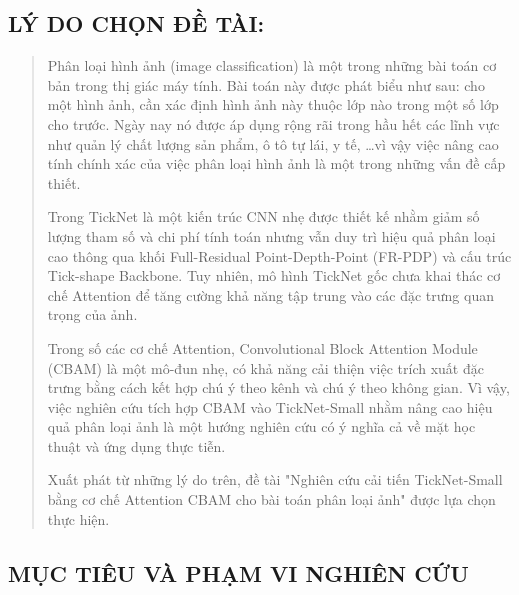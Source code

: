 \documentclass[
]{article}
\begin{document}
\hypertarget{luxfd-do-chux1ecdn-ux111ux1ec1-tuxe0i}{%
\subsection{LÝ DO CHỌN ĐỀ
TÀI:}\label{luxfd-do-chux1ecdn-ux111ux1ec1-tuxe0i}}

\begin{quote}
Phân loại hình ảnh (image classification) là một trong những bài toán cơ
bản trong thị giác máy tính. Bài toán này được phát biểu như sau: cho
một hình ảnh, cần xác định hình ảnh này thuộc lớp nào trong một số lớp
cho trước. Ngày nay nó được áp dụng rộng rãi trong hầu hết các lĩnh vực
như quản lý chất lượng sản phẩm, ô tô tự lái, y tế, \ldots vì vậy việc
nâng cao tính chính xác của việc phân loại hình ảnh là một trong những
vấn đề cấp thiết.

Trong TickNet là một kiến trúc CNN nhẹ được thiết kế nhằm giảm số lượng
tham số và chi phí tính toán nhưng vẫn duy trì hiệu quả phân loại cao
thông qua khối Full-Residual Point-Depth-Point (FR-PDP) và cấu trúc
Tick-shape Backbone. Tuy nhiên, mô hình TickNet gốc chưa khai thác cơ
chế Attention để tăng cường khả năng tập trung vào các đặc trưng quan
trọng của ảnh.

Trong số các cơ chế Attention, Convolutional Block Attention Module
(CBAM) là một mô-đun nhẹ, có khả năng cải thiện việc trích xuất đặc
trưng bằng cách kết hợp chú ý theo kênh và chú ý theo không gian. Vì
vậy, việc nghiên cứu tích hợp CBAM vào TickNet-Small nhằm nâng cao hiệu
quả phân loại ảnh là một hướng nghiên cứu có ý nghĩa cả về mặt học thuật
và ứng dụng thực tiễn.

Xuất phát từ những lý do trên, đề tài "Nghiên cứu cải tiến TickNet-Small
bằng cơ chế Attention CBAM cho bài toán phân loại ảnh" được lựa chọn
thực hiện.
\end{quote}

\hypertarget{mux1ee5c-tiuxeau-vuxe0-phux1ea1m-vi-nghiuxean-cux1ee9u}{%
\subsection{MỤC TIÊU VÀ PHẠM VI NGHIÊN
CỨU}\label{mux1ee5c-tiuxeau-vuxe0-phux1ea1m-vi-nghiuxean-cux1ee9u}}
\end{document}
